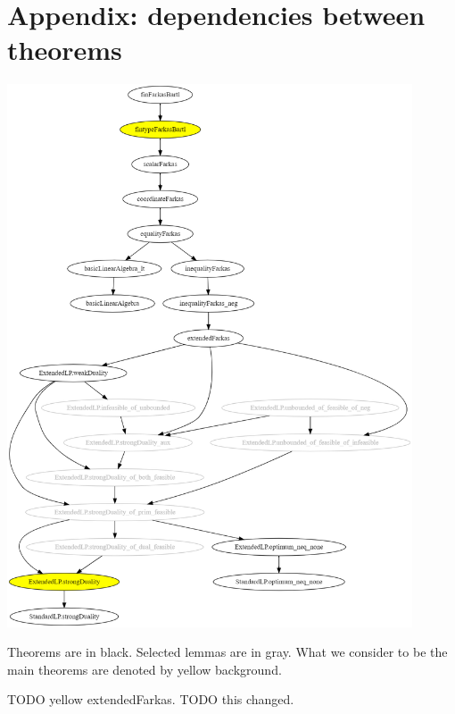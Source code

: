 \documentclass[]{article}
\renewcommand{\.}{\hskip .75pt}
\begin{document}




%

\section{Appendix: dependencies between theorems}

\includegraphics[width=0.9\textwidth]{theorems.png}

Theorems are in black. Selected lemmas are in gray.
What we consider to be the main theorems are
denoted by yellow background.

TODO yellow extendedFarkas.
{\color{blue} TODO this changed.}
\end{document}

